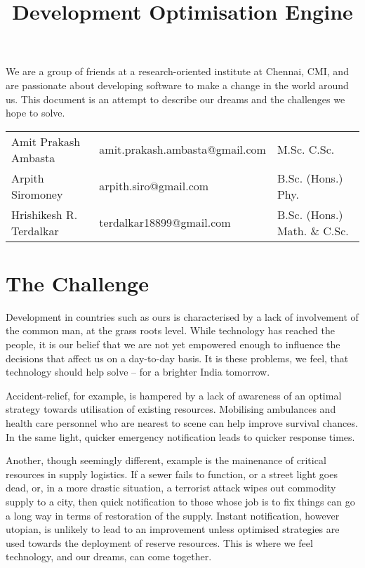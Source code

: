 \documentclass{report}
\begin{document}
\title{Development Optimisation Engine}

\maketitle
We are a group of friends at a research-oriented institute at Chennai, CMI, and are passionate about developing software to make a change in the world around us.  This document is an attempt to describe our dreams and the challenges we hope to solve.

\begin{tabular}{l|ll}
Amit Prakash Ambasta & amit.prakash.ambasta@gmail.com & M.Sc. C.Sc.\\
Arpith Siromoney & arpith.siro@gmail.com & B.Sc. (Hons.) Phy.\\
Hrishikesh R. Terdalkar & terdalkar18899@gmail.com & B.Sc. (Hons.) Math. \& C.Sc.\\
\end{tabular}

\section*{The Challenge}
Development in countries such as ours is characterised by a lack of involvement of the common man, at the grass roots level.  While technology has reached the people, it is our belief that we are not yet empowered enough to influence the decisions that affect us on a day-to-day basis.  It is these problems, we feel, that technology should help solve -- for a brighter India tomorrow.

Accident-relief, for example, is hampered by a lack of awareness of an optimal strategy towards utilisation of existing resources.  Mobilising ambulances and health care personnel who are nearest to scene can help improve survival chances.  In the same light, quicker emergency notification leads to quicker response times.

Another, though seemingly different, example is the mainenance of critical resources in supply logistics.  If a sewer fails to function, or a street light goes dead, or, in a more drastic situation, a terrorist attack wipes out commodity supply to a city, then quick notification to those whose job is to fix things can go a long way in terms of restoration of the supply.  Instant notification, however utopian, is unlikely to lead to an improvement unless optimised strategies are used towards the deployment of reserve resources.  This is where we feel technology, and our dreams, can come together.
\end{document}
